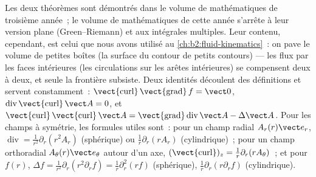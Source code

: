 \begin{remark}\label{rem:b2:maxwell-equations:whyadmitted}
Les deux théorèmes sont démontrés dans le volume de mathématiques de troisième année~; le
volume de mathématiques de cette année s'arrête à leur version plane
(Green--Riemann) et aux intégrales multiples. Leur contenu, cependant, est
celui que nous avons utilisé au \cref{ch:b2:fluid-kinematics}~: on pave le volume de
petites boîtes (la surface du contour de petits contours) --- les flux
par les faces intérieures (les circulations sur les arêtes
intérieures) se compensent deux à deux, et seule la frontière subsiste. Deux identités
découlent des définitions et servent constamment~:
$\operatorname{\vect{curl}}\operatorname{\vect{grad}}f = \vect 0$,
$\operatorname{div}\operatorname{\vect{curl}}\vect A = 0$, et
$\operatorname{\vect{curl}}\operatorname{\vect{curl}}\vect A = \operatorname{\vect{grad}}
\operatorname{div}\vect A - \Delta\vect A$. Pour les champs à symétrie, les
formules utiles sont~: pour un champ radial $A_r(r)\vect e_r$, $\operatorname{div}
= \frac1{r^2}\partial_r(r^2A_r)$ (sphérique) ou $\frac1r\partial_r(rA_r)$
(cylindrique)~; pour un champ orthoradial $A_\theta(r)\vect e_\theta$ autour d'un
axe, $(\operatorname{\vect{curl}})_z = \frac1r\partial_r(rA_\theta)$~; et pour $f(r)$,
$\Delta f = \frac1{r^2}\partial_r(r^2\partial_rf) = \frac1r\partial_r^2(rf)$ (sphérique),
$\frac1r\partial_r(r\partial_rf)$ (cylindrique).
\end{remark}

